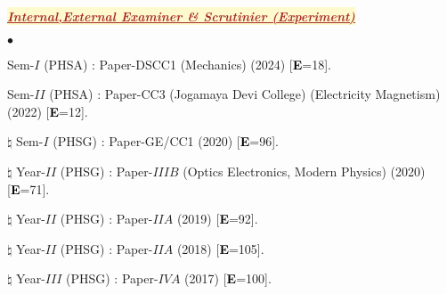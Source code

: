 \documentclass[margin,line]{res}
\newenvironment{list1}{
  \begin{list}{\ding{113}}{%
      \setlength{\itemsep}{0in}
      \setlength{\parsep}{0in} \setlength{\parskip}{0in}
      \setlength{\topsep}{0in} \setlength{\partopsep}{0in} 
      \setlength{\leftmargin}{0.17in}}}{\end{list}}
\newenvironment{list2}{
  \begin{list}{$\bullet$}{%
      \setlength{\itemsep}{0in}
      \setlength{\parsep}{0in} \setlength{\parskip}{0in}
      \setlength{\topsep}{0in} \setlength{\partopsep}{0in} 
      \setlength{\leftmargin}{0.2in}}}{\end{list}}
\begin{document}
\begin{resume}
\begin{list1}
\item[] \colorbox{lemonchiffon}{\textcolor{brown}{\underline{\textbf{\textit{Internal,External Examiner \& Scrutinier (Experiment)}}}}}
\vspace{1mm}
\end{list1}
\begin{list2}
\item Sem-$I$ (PHSA) : Paper-DSCC1 (Mechanics) (2024) [\textcolor{black}{\bf E}=18]. 
\item Sem-$II$ (PHSA) : Paper-CC3 (Jogamaya Devi College) (Electricity Magnetism) (2022) [\textcolor{black}{\bf E}=12]. 
\item[$\pmb{\natural}$] Sem-$I$ (PHSG) : Paper-GE/CC1 (2020) [\textcolor{black}{\bf E}=96]. 
\item[$\pmb{\natural}$] Year-$II$ (PHSG) : Paper-$IIIB$ (Optics Electronics, Modern Physics) (2020) [\textcolor{black}{\bf E}=71]. 
\item[$\pmb{\natural}$] Year-$II$ (PHSG) : Paper-$IIA$ (2019) [\textcolor{black}{\bf E}=92].
\item[$\pmb{\natural}$] Year-$II$ (PHSG) : Paper-$IIA$ (2018) [\textcolor{black}{\bf E}=105].
\item[$\pmb{\natural}$] Year-$III$ (PHSG) : Paper-$IVA$ (2017) [\textcolor{black}{\bf E}=100].
\end{list2}
\vspace{2mm}


\end{resume}
\end{document}
